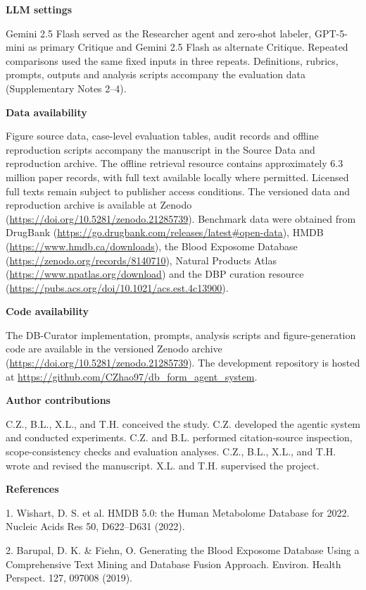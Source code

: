 \documentclass[
]{article}
\begin{document}
\textbf{LLM settings}

Gemini 2.5 Flash served as the Researcher agent and zero-shot labeler, GPT-5-mini as primary Critique and Gemini 2.5 Flash as alternate Critique. Repeated comparisons used the same fixed inputs in three repeats. Definitions, rubrics, prompts, outputs and analysis scripts accompany the evaluation data (Supplementary Notes 2--4).

\textbf{Data availability}

Figure source data, case-level evaluation tables, audit records and offline reproduction scripts accompany the manuscript in the Source Data and reproduction archive. The offline retrieval resource contains approximately 6.3 million paper records, with full text available locally where permitted. Licensed full texts remain subject to publisher access conditions. The versioned data and reproduction archive is available at Zenodo (\url{https://doi.org/10.5281/zenodo.21285739}). Benchmark data were obtained from DrugBank (\url{https://go.drugbank.com/releases/latest#open-data}), HMDB (\url{https://www.hmdb.ca/downloads}), the Blood Exposome Database (\url{https://zenodo.org/records/8140710}), Natural Products Atlas (\url{https://www.npatlas.org/download}) and the DBP curation resource (\url{https://pubs.acs.org/doi/10.1021/acs.est.4c13900}).

\textbf{Code availability}

The DB-Curator implementation, prompts, analysis scripts and figure-generation code are available in the versioned Zenodo archive (\url{https://doi.org/10.5281/zenodo.21285739}). The development repository is hosted at \url{https://github.com/CZhao97/db_form_agent_system}.

\textbf{Author contributions}

C.Z., B.L., X.L., and T.H. conceived the study. C.Z. developed the agentic system and conducted experiments. C.Z. and B.L. performed citation-source inspection, scope-consistency checks and evaluation analyses. C.Z., B.L., X.L., and T.H. wrote and revised the manuscript. X.L. and T.H. supervised the project.

\textbf{References}

1. Wishart, D. S. et al. HMDB 5.0: the Human Metabolome Database for 2022. Nucleic Acids Res 50, D622--D631 (2022).

2. Barupal, D. K. \& Fiehn, O. Generating the Blood Exposome Database Using a Comprehensive Text Mining and Database Fusion Approach. Environ. Health Perspect. 127, 097008 (2019).
\end{document}
